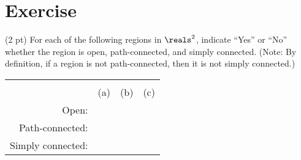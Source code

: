 \section{Exercise}

(2 pt) For each of the following regions in $\reals^{2}$, indicate ``Yes'' or ``No'' whether the region is open, path-connected, and simply connected. (Note: By definition, if a region is not path-connected, then it is not simply connected.)
\begin{center}
\begin{tabular}{rccc}
\vspace{1in}					&		&		&		\\
							&	(a)	&	(b)	&	(c)	\\
\hline
\vspace{.25in}Open:				&	\hspace{1.25in}	&	\hspace{1.25in}	&	\hspace{1.25in}	\\
\hline
\vspace{.25in}Path-connected:		&		&		&		\\
\hline
\vspace{.25in}Simply connected:	&		&		&		\\
\hline
\end{tabular}
\end{center}